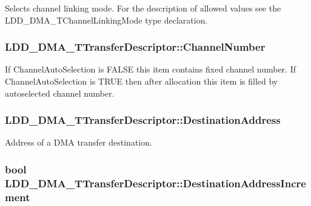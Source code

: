 Selects channel linking mode. For the description of allowed values see the L\-D\-D\-\_\-\-D\-M\-A\-\_\-\-T\-Channel\-Linking\-Mode type declaration. \hypertarget{struct_l_d_d___d_m_a___t_transfer_descriptor_a22d5f3770a3c62c4bb7e426b4d5d96c8}{
\subsubsection[{Channel\-Number}]{ L\-D\-D\-\_\-\-D\-M\-A\-\_\-\-T\-Transfer\-Descriptor\-::\-Channel\-Number}}\label{struct_l_d_d___d_m_a___t_transfer_descriptor_a22d5f3770a3c62c4bb7e426b4d5d96c8}
If Channel\-Auto\-Selection is F\-A\-L\-S\-E this item contains fixed channel number. If Channel\-Auto\-Selection is T\-R\-U\-E then after allocation this item is filled by autoselected channel number. \hypertarget{struct_l_d_d___d_m_a___t_transfer_descriptor_a36982f9f85fdeab04f7942d173f9bcb7}{
\subsubsection[{Destination\-Address}]{ L\-D\-D\-\_\-\-D\-M\-A\-\_\-\-T\-Transfer\-Descriptor\-::\-Destination\-Address}}\label{struct_l_d_d___d_m_a___t_transfer_descriptor_a36982f9f85fdeab04f7942d173f9bcb7}
Address of a D\-M\-A transfer destination. \hypertarget{struct_l_d_d___d_m_a___t_transfer_descriptor_a4f0e7ef5b8fc25661c26ded1e89a1c95}{
\subsubsection[{Destination\-Address\-Increment}]{\setlength{\rightskip}{0pt plus 5cm}bool L\-D\-D\-\_\-\-D\-M\-A\-\_\-\-T\-Transfer\-Descriptor\-::\-Destination\-Address\-Increment}}\label{struct_l_d_d___d_m_a___t_transfer_descriptor_a4f0e7ef5b8fc25661c26ded1e89a1c95}
